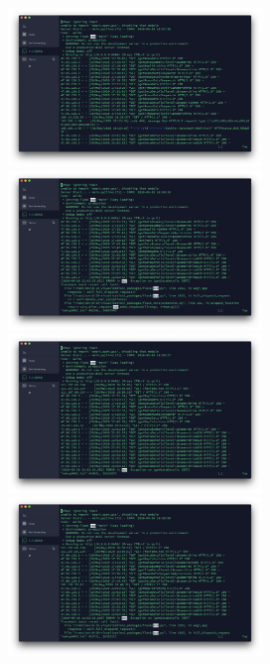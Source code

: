 \documentclass{article}
\begin{document}
\begin{figure}[H]
\centering
\includegraphics[width=0.6\textwidth]{progress-report-3/log0.png}
\includegraphics[width=0.6\textwidth]{progress-report-3/log1.png}
\includegraphics[width=0.6\textwidth]{progress-report-3/log2.png}
\includegraphics[width=0.6\textwidth]{progress-report-3/log3.png}
\end{figure}
\end{document}
